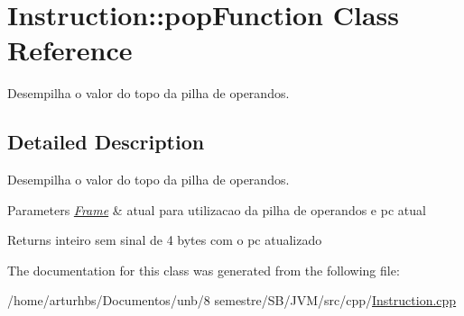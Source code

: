\hypertarget{classInstruction_1_1popFunction}{}\section{Instruction\+:\+:pop\+Function Class Reference}
\label{classInstruction_1_1popFunction}


Desempilha o valor do topo da pilha de operandos.  




\subsection{Detailed Description}
Desempilha o valor do topo da pilha de operandos. 


\begin{DoxyParams}{Parameters}
{\em \hyperlink{classFrame}{Frame}} & atual para utilizacao da pilha de operandos e pc atual \\
\hline
\end{DoxyParams}
\begin{DoxyReturn}{Returns}
inteiro sem sinal de 4 bytes com o pc atualizado 
\end{DoxyReturn}


The documentation for this class was generated from the following file\+:\begin{DoxyCompactItemize}
\item 
/home/arturhbs/\+Documentos/unb/8 semestre/\+S\+B/\+J\+V\+M/src/cpp/\hyperlink{Instruction_8cpp}{Instruction.\+cpp}\end{DoxyCompactItemize}
